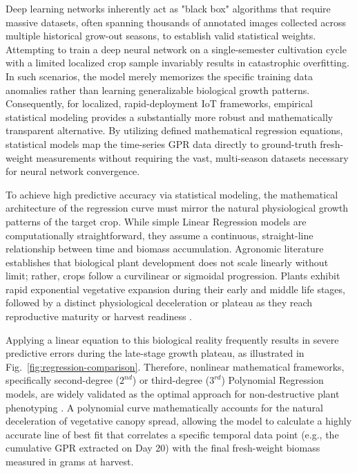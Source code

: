 Deep learning networks inherently act as "black box" algorithms that require massive datasets, often spanning thousands of annotated images collected across multiple historical grow-out seasons, to establish valid statistical weights. Attempting to train a deep neural network on a single-semester cultivation cycle with a limited localized crop sample invariably results in catastrophic overfitting. In such scenarios, the model merely memorizes the specific training data anomalies rather than learning generalizable biological growth patterns. Consequently, for localized, rapid-deployment IoT frameworks, empirical statistical modeling provides a substantially more robust and mathematically transparent alternative. By utilizing defined mathematical regression equations, statistical models map the time-series GPR data directly to ground-truth fresh-weight measurements without requiring the vast, multi-season datasets necessary for neural network convergence.

To achieve high predictive accuracy via statistical modeling, the mathematical architecture of the regression curve must mirror the natural physiological growth patterns of the target crop. While simple Linear Regression models are computationally straightforward, they assume a continuous, straight-line relationship between time and biomass accumulation. Agronomic literature establishes that biological plant development does not scale linearly without limit; rather, crops follow a curvilinear or sigmoidal progression. Plants exhibit rapid exponential vegetative expansion during their early and middle life stages, followed by a distinct physiological deceleration or plateau as they reach reproductive maturity or harvest readiness \cite{Ge2016}.

Applying a linear equation to this biological reality frequently results in severe predictive errors during the late-stage growth plateau, as illustrated in Fig.~\ref{fig:regression-comparison}. Therefore, nonlinear mathematical frameworks, specifically second-degree (\(2^{nd}\)) or third-degree (\(3^{rd}\)) Polynomial Regression models, are widely validated as the optimal approach for non-destructive plant phenotyping \cite{Archontoulis2015}. A polynomial curve mathematically accounts for the natural deceleration of vegetative canopy spread, allowing the model to calculate a highly accurate line of best fit that correlates a specific temporal data point (e.g., the cumulative GPR extracted on Day 20) with the final fresh-weight biomass measured in grams at harvest. 

